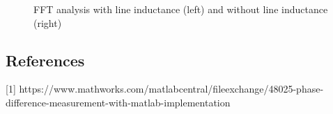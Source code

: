 \documentclass[fleqn, a4paper]{report}
\begin{document}
\begin{figure}[H]%
    \centering
    \qquad
    \caption{FFT analysis with line inductance (left) and without line inductance (right)}%
    \label{fig:example}%
\end{figure}

\subsection*{References}
[1] https://www.mathworks.com/matlabcentral/fileexchange/48025-phase-difference-measurement-with-matlab-implementation
\end{document}

